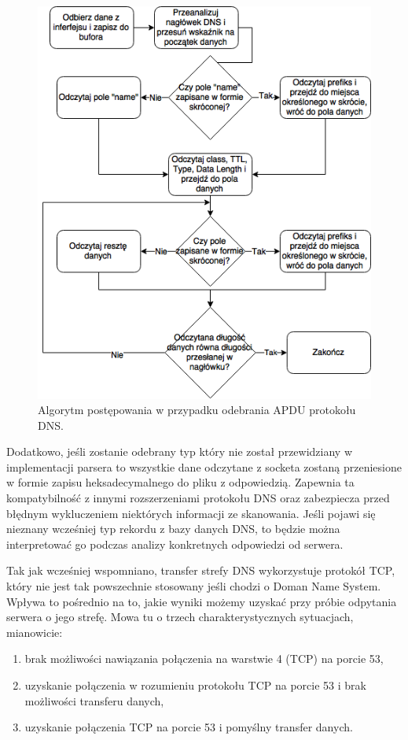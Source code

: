 \begin{figure}[ht]
	\centering
	\includegraphics[width=1.0\textwidth]{image/receiving}
	\caption{Algorytm postępowania w przypadku odebrania APDU protokołu DNS.}
	\label{fig:receiving}
\end{figure}

Dodatkowo, jeśli zostanie odebrany typ który nie został przewidziany w implementacji parsera to wszystkie dane odczytane z
socketa zostaną przeniesione w formie zapisu heksadecymalnego do pliku z odpowiedzią. Zapewnia ta kompatybilność z innymi
rozszerzeniami protokołu DNS oraz zabezpiecza przed błędnym wykluczeniem niektórych informacji ze skanowania. Jeśli pojawi
się nieznany wcześniej typ rekordu z bazy danych DNS, to będzie można interpretować go podczas analizy konkretnych odpowiedzi
od serwera.

Tak jak wcześniej wspomniano, transfer strefy DNS wykorzystuje protokół TCP, który nie jest tak powszechnie stosowany jeśli chodzi
o Doman Name System. Wpływa to pośrednio na to, jakie wyniki możemy uzyskać przy próbie odpytania serwera o jego strefę. Mowa tu o
trzech charakterystycznych sytuacjach, mianowicie:
\begin{enumerate}
	\item brak możliwości nawiązania połączenia na warstwie 4 (TCP) na porcie 53,
	\item uzyskanie połączenia w rozumieniu protokołu TCP na porcie 53 i brak możliwości transferu danych,
	\item uzyskanie połączenia TCP na porcie 53 i pomyślny transfer danych.
\end{enumerate}

